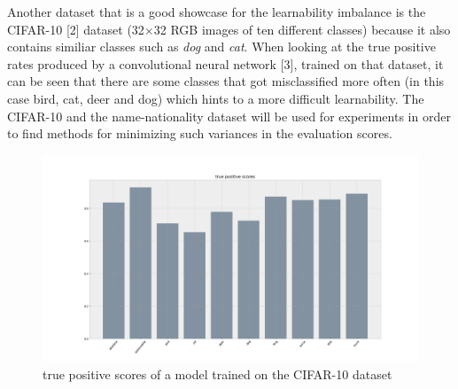 \documentclass[journal]{IEEEtran}
\begin{document}
Another dataset that is a good showcase for the learnability imbalance is the CIFAR-10 [2] dataset (32$\times$32 RGB images of ten different classes) because it also contains similiar classes such as \emph{dog} and \emph{cat}.
When looking at the true positive rates produced by a convolutional neural network [3], trained on that dataset, it can be seen that there are some classes that got misclassified more often (in this case bird, cat, deer and dog) which hints to a more difficult learnability. 
The CIFAR-10 and the name-nationality dataset will be used for experiments in order to find methods for minimizing such variances in the evaluation scores.

\begin{figure}[h!]
        \includegraphics[width=\linewidth]{images/cifar10_tp_scores.png}
        \caption{true positive scores of a model trained on the CIFAR-10 dataset}
        \label{fig:tp2_scores}
\end{figure}

\end{document}
